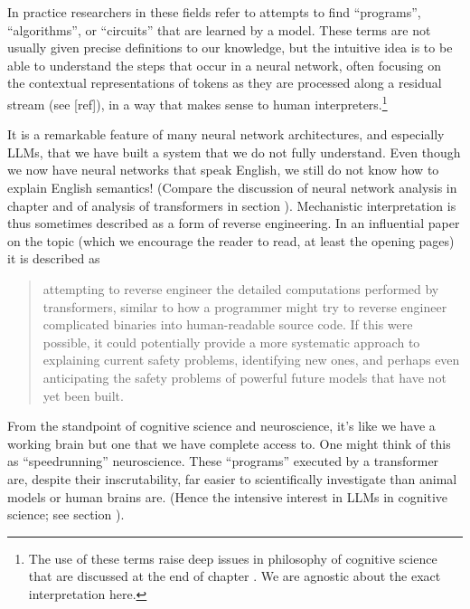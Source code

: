 In practice researchers in these fields refer to attempts to find ``programs'', ``algorithms'', or ``circuits'' that are learned by a model. These terms are not usually given precise definitions to our knowledge, but the intuitive idea is to be able to understand the steps that occur in a neural network, often focusing on the contextual representations of tokens as they are processed along a residual stream (see [ref]), in a way that makes sense to human interpreters.\footnote{The use of these terms raise deep issues in philosophy of cognitive science that are discussed at the end of chapter .  We are agnostic about the exact interpretation here.}

It is a remarkable feature of many neural network architectures, and especially LLMs, that we have built a system that we do not fully understand. Even though we now have neural networks that speak English, we still do not know how to explain English semantics! (Compare the discussion of neural network analysis in chapter  and of analysis of transformers in section ). Mechanistic interpretation is thus sometimes described as a form of reverse engineering. In an influential paper on the topic (which we encourage the reader to read, at least the opening pages) it is described as

\begin{quote}
attempting to reverse engineer the detailed computations performed by transformers, similar to how a programmer might try to reverse engineer complicated binaries into human-readable source code.  If this were possible, it could potentially provide a more systematic approach to explaining current safety problems, identifying new ones, and perhaps even anticipating the safety problems of powerful future models that have not yet been built.\cite{elhage2021mathematical} 
\end{quote}

From the standpoint of cognitive science and neuroscience, it’s like we have a working brain but one that we have complete access to. One might think of this as ``speedrunning'' neuroscience.  These ``programs'' executed by a transformer are, despite their inscrutability, far easier to scientifically investigate than animal models or human brains are. (Hence the intensive interest in LLMs in cognitive science; see section ).


